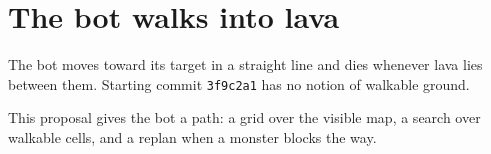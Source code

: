 \section{The bot walks into lava}
The bot moves toward its target in a straight line and dies whenever lava lies between them. Starting commit \verb|3f9c2a1| has no notion of walkable ground.

This proposal gives the bot a path: a grid over the visible map, a search over walkable cells, and a replan when a monster blocks the way.
